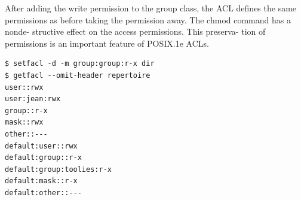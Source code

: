 After adding the write permission to the group class, the ACL defines the same permissions as before taking the permission away. The chmod command has a nonde- structive effect on the access permissions. This preserva- tion of permissions is an important feature of POSIX.1e ACLs.





\begin{verbatim}
$ setfacl -d -m group:group:r-x dir 
$ getfacl --omit-header repertoire 
user::rwx
user:jean:rwx
group::r-x 
mask::rwx
other::---
default:user::rwx
default:group::r-x
default:group:toolies:r-x
default:mask::r-x
default:other::---
\end{verbatim} 
% 





